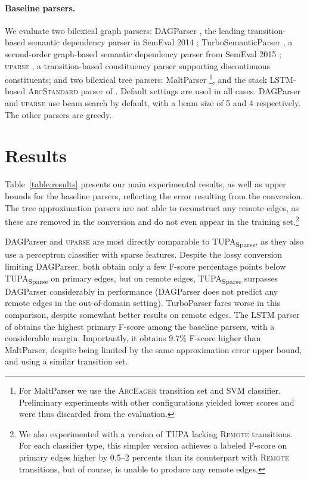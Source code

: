 \documentclass[11pt,a4paper]{article}
\newcommand{\parser}[1]{TUPA\textsubscript{#1}}
\newcommand{\tabref}[1]{Table~\ref{#1}}
\begin{document}
\paragraph{Baseline parsers.}
We evaluate two bilexical graph parsers:
DAGParser \cite{ribeyre-villemontedelaclergerie-seddah:2014:SemEval}, the leading 
transition-based semantic dependency parser in SemEval 2014 \cite{oepen2014semeval};
TurboSemanticParser \cite{almeida-martins:2015:SemEval},
a second-order graph-based semantic dependency parser from SemEval 2015 
\cite{oepen2015semeval};
\textsc{uparse} \cite{maier-lichte:2016:DiscoNLP},
a transition-based constituency parser supporting discontinuous constituents;
and two bilexical tree parsers:
MaltParser \cite{nivre2007maltparser}\footnote{For
MaltParser we use the \textsc{ArcEager} transition set and SVM classifier.
Preliminary experiments with other configurations yielded lower scores and
were thus discarded from the evaluation.},
and the stack LSTM-based \textsc{ArcStandard} parser of
\citet[henceforce ``LSTM Parser'']{dyer2015transition}.
Default settings are used in all cases.
DAGParser and \textsc{uparse} use beam search by default, with a beam size of 5 and 4
respectively. The other parsers are greedy.



\section{Results}\label{sec:results}

\tabref{table:results} presents our main experimental results, as well as
upper bounds for the baseline parsers,
reflecting the error resulting from the conversion.
The tree approximation parsers are not able to reconstruct any remote edges,
as these are removed in the conversion and do not even appear in the training set.\footnote{We
also experimented with a version of \parser{} lacking
\textsc{Remote} transitions. For each classifier type, this simpler version achieves a labeled
F-score on primary edges higher by 0.5--2 percents than its counterpart with \textsc{Remote}
transitions, but of course, is unable to produce any remote edges.}

DAGParser and \textsc{uparse} are most directly comparable to
\parser{Sparse}, as they also use a perceptron classifier with sparse features.
Despite the lossy conversion limiting DAGParser,
both obtain only a few F-score percentage points below
\parser{Sparse} on primary edges, but on remote edges, \parser{Sparse}
surpasses DAGParser considerably in performance
(DAGParser does not predict any remote edges in the out-of-domain setting).
TurboParser fares worse in this comparison, despite somewhat better results on
remote edges.
The LSTM parser of \citet{dyer2015transition} obtains the highest primary F-score
among the baseline parsers,
with a considerable margin. Importantly, it obtains 9.7\% F-score
higher than MaltParser,
despite being limited by the same approximation error upper bound,
and using a similar transition set.
\end{document}
